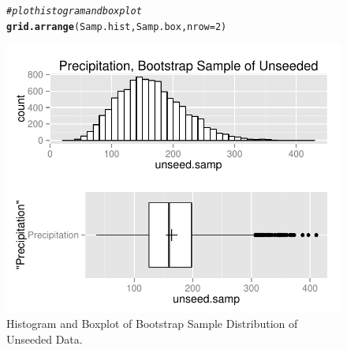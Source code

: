 \documentclass{article}\usepackage[]{graphicx}\usepackage[]{color}
\makeatletter
\def\maxwidth{ %
  \ifdim\Gin@nat@width>\linewidth
    \linewidth
  \else
    \Gin@nat@width
  \fi
}
\newcommand{\hlnum}[1]{\textcolor[rgb]{0.686,0.059,0.569}{#1}}%
\newcommand{\hlcom}[1]{\textcolor[rgb]{0.678,0.584,0.686}{\textit{#1}}}%
\newcommand{\hlstd}[1]{\textcolor[rgb]{0.345,0.345,0.345}{#1}}%
\newcommand{\hlkwc}[1]{\textcolor[rgb]{0.333,0.667,0.333}{#1}}%
\newcommand{\hlkwd}[1]{\textcolor[rgb]{0.737,0.353,0.396}{\textbf{#1}}}%
\newenvironment{kframe}{%
 \def\at@end@of@kframe{}%
 \ifinner\ifhmode%
  \def\at@end@of@kframe{\end{minipage}}%
  \begin{minipage}{\columnwidth}%
 \fi\fi%
 \def\FrameCommand##1{\hskip\@totalleftmargin \hskip-\fboxsep
 \colorbox{shadecolor}{##1}\hskip-\fboxsep
     \hskip-\linewidth \hskip-\@totalleftmargin \hskip\columnwidth}%
 \MakeFramed {\advance\hsize-\width
   \@totalleftmargin\z@ \linewidth\hsize
   \@setminipage}}%
 {\par\unskip\endMakeFramed%
 \at@end@of@kframe}
\newenvironment{knitrout}{}{} %
\makeatother
\begin{document}
\begin{figure}[H]  \begin{center} \vspace{-0.45in}
\begin{knitrout}
\color{fgcolor}\begin{kframe}
\begin{alltt}
\hlcom{# plot histogram and boxplot}
\hlkwd{grid.arrange}\hlstd{(Samp.hist, Samp.box,} \hlkwc{nrow} \hlstd{=} \hlnum{2}\hlstd{)}
\end{alltt}
\end{kframe}
\includegraphics[width=\maxwidth]{figure/1a_box_unseed_plot} 

\end{knitrout}
\end{center}\caption{Histogram and Boxplot of Bootstrap Sample Distribution of Unseeded Data.} \end{figure}
\end{document}
